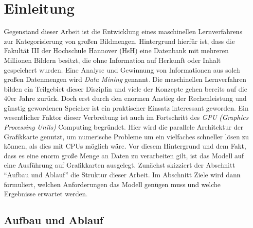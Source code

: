 \chapter{Einleitung}

Gegenstand dieser Arbeit ist die Entwicklung eines maschinellen Lernverfahrens zur Kategorisierung von großen Bildmengen. Hintergrund hierfür ist, dass die Fakultät III der Hochschule Hannover (HsH) eine Datenbank mit mehreren Millionen Bildern besitzt, die ohne Information auf Herkunft oder Inhalt gespeichert wurden. Eine Analyse und Gewinnung von Informationen aus solch großen Datenmengen wird \textit{Data Mining} genannt. Die maschinellen Lernverfahren bilden ein Teilgebiet dieser Disziplin und viele der Konzepte gehen bereits auf die 40er Jahre zurück. Doch erst durch den enormen Anstieg der Rechenleistung und günstig gewordenen Speicher ist ein praktischer Einsatz interessant geworden. 
Ein wesentlicher Faktor dieser Verbreitung ist auch im Fortschritt des \textit{GPU (Graphics Processing Units)} Computing begründet. Hier wird die parallele Architektur der Grafikkarte genutzt, um numerische Probleme um ein vielfaches schneller lösen zu können, als dies mit CPUs möglich wäre. Vor diesem Hintergrund und dem Fakt, dass es eine enorm große Menge an Daten zu verarbeiten gilt, ist das Modell auf eine Ausführung auf Grafikkarten ausgelegt. \newline
Zunächst skizziert der Abschnitt \enquote{Aufbau und Ablauf} die Struktur dieser Arbeit. Im Abschnitt Ziele wird dann formuliert, welchen Anforderungen das Modell genügen muss und welche Ergebnisse erwartet werden.

\section{Aufbau und Ablauf}

